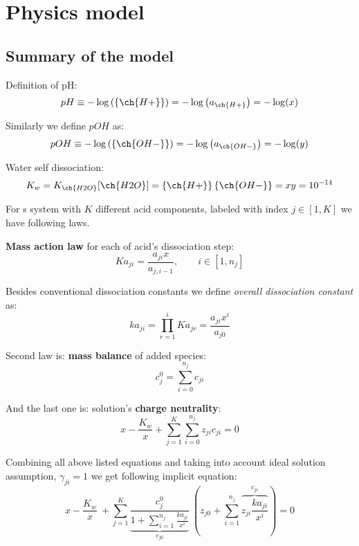 \section{Physics model}

\subsection{Summary of the model}

Definition of pH:
\begin{equation} \label{eq:pHdef1}
    pH \equiv -\log\left(\{\ch{H+}\}\right) = -\log\left(a_{\ch{H+}}\right) = -\log(x)
\end{equation}

Similarly we define $pOH$ as:
\begin{equation} \label{eq:pOHdef1}
    pOH \equiv -\log\left(\{\ch{OH-}\}\right) = -\log\left(a_{\ch{OH-}}\right) = -\log(y)
\end{equation}

Water self dissociation:
\begin{equation}
    K_w = K_{\ch{H2O}}[\ch{H2O}] = \left\{\ch{H+}\right\} \left\{\ch{OH-}\right\} = x y = 10 ^ {-14}
\end{equation}

For s system with $K$ different acid components, labeled with index $j \in [1, K]$ we have following laws.

\textbf{Mass action law} for each of acid's dissociation step:
\begin{equation}
    Ka_{ji} = \frac{a_{ji}x}{a_{j,i-1}},\qquad i \in [1, n_j]
\end{equation}

Besides conventional dissociation constants we define \emph{overall dissociation constant} as:
\begin{equation}
    ka_{ji} = \prod_{r=1}^{i} Ka_{jr} = \frac{a_{ji}x^i}{a_{j0}}
\end{equation}

Second law is: \textbf{mass balance} of added species:
\begin{equation}
    c^0_{j} = \sum_{i=0}^{n_j} c_{ji}
\end{equation}

And the last one is: solution's \textbf{charge neutrality}:
\begin{equation}
    x - \frac{K_w}{x} + \sum_{j=1}^{K} \sum_{i=0}^{n_j} z_{ji} c_{ji} = 0
\end{equation}


Combining all above listed equations and taking into account ideal solution assumption,
$\gamma_{ji} = 1$ we get following implicit equation:
\begin{equation}
    x - \frac{K_w}{x} \
    + \sum_{j=1}^{K} \underbrace{\frac{c^0_{j}}{1+\sum_{i=1}^{n_j}\frac{ka_{ji}}{x^i}}}_{c_{j0}} \
    \left(z_{j0} + \sum_{i=1}^{n_j}\overbrace{z_{ji}\frac{ka_{ji}}{x^i}}^{c_{ji}}\right) = 0
\end{equation}

